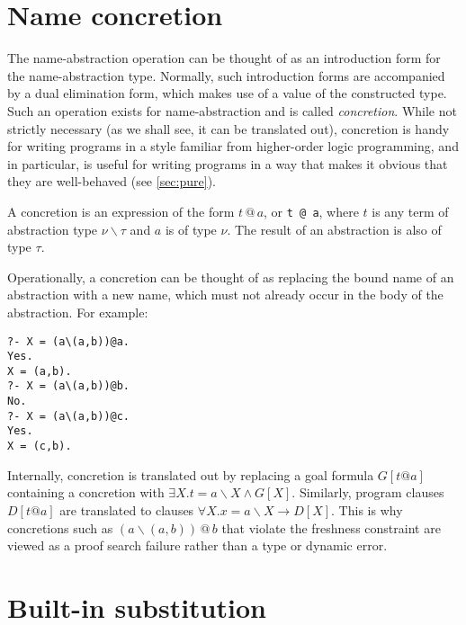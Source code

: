 \documentclass[draft,12pt]{report}
\makeatletter
\newcommand{\abs}{\backslash}
\newcommand{\conc}{\mathop{@}}
\makeatother
\begin{document}
\section{Name concretion}

The name-abstraction operation can be thought of as an introduction form for
the name-abstraction type.  Normally, such introduction forms are accompanied by a dual elimination form, which makes use of a value of the constructed type.  Such an operation exists for name-abstraction and is called \emph{concretion}.  While not strictly necessary (as we shall see, it can be translated out), concretion is handy for writing programs in a style familiar from higher-order logic programming, and in particular, is useful for writing programs in a way that makes it obvious that they are well-behaved (see \ref{sec:pure}).

A concretion is an expression of the form $t \conc a$, or \verb|t @ a|, where
$t$ is any term of abstraction type $\nu \abs \tau$ and $a$ is of type $\nu$.
The result of an abstraction is also of type $\tau$.

Operationally, a concretion can be thought of as replacing the bound name of an abstraction with a new name, which must not already occur in the body of the abstraction.  For example:
\begin{verbatim}
?- X = (a\(a,b))@a.
Yes.
X = (a,b).
?- X = (a\(a,b))@b.
No.
?- X = (a\(a,b))@c.
Yes.
X = (c,b).
\end{verbatim}

Internally, concretion is translated out by replacing a goal formula
$G[t@a]$ containing a concretion with $\exists X. t = a \abs X \wedge G[X]$.
Similarly, program clauses $D[t @ a]$ are translated to clauses $\forall X. x = a \abs X \rightarrow D[X]$.  This is why concretions such as $(a \abs(a,b)) \conc b$ that violate the freshness constraint are viewed as a proof search failure rather than a type or dynamic error.

\section{Built-in substitution}
\end{document}
